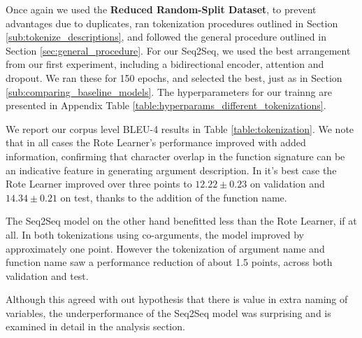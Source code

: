 Once again we used the \textbf{Reduced Random-Split Dataset}, to prevent advantages due to duplicates, ran tokenization procedures outlined in Section \ref{sub:tokenize_descriptions}, and followed the general procedure outlined in Section \ref{sec:general_procedure}. For our Seq2Seq, we used the best arrangement from our first experiment, including a bidirectional encoder, attention and dropout. We ran these for 150 epochs, and selected the best, just as in Section \ref{sub:comparing_baseline_models}. The hyperparameters for our trainng are presented in Appendix Table \ref{table:hyperparams_different_tokenizations}.

We report our corpus level BLEU-4 results in Table \ref{table:tokenization}. 
We note that in all cases the Rote Learner's performance improved with added information, confirming that character overlap in the function signature can be an indicative feature in generating argument description.
In it's best case the Rote Learner improved over three points to $12.22 \pm 0.23$ on validation and $14.34 \pm 0.21$ on test, thanks to the addition of the function name. 

The Seq2Seq model on the other hand benefitted less than the Rote Learner, if at all. In both tokenizations using co-arguments, the model improved by approximately one point. However the tokenization of argument name and function name saw a performance reduction of about 1.5 points, across both validation and test.

Although this agreed with out hypothesis that there is value in extra naming of variables, the underperformance of the Seq2Seq model was surprising and is examined in detail in the analysis section.

